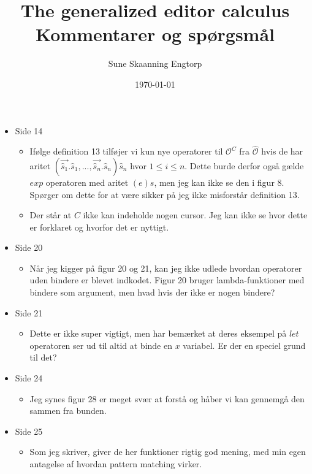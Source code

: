 \documentclass{article}
\title{The generalized editor calculus \\ Kommentarer og spørgsmål}
\date{\today}
\author{Sune Skaanning Engtorp}
\begin{document}
\maketitle

\begin{itemize}
    \item Side 14
        \begin{itemize}
            \item Ifølge definition 13 tilføjer vi kun nye operatorer til $\mathcal{O}^C$ fra $\hat{\mathcal{O}}$ hvis de har aritet $( \overrightarrow{\hat{s}_1}.\hat{s}_1,...,\overrightarrow{\hat{s}_n}.\hat{s}_n)\hat{s}_n$ hvor $1\leq i \leq n$. Dette burde derfor også gælde $exp$ operatoren med aritet $(e)s$, men jeg kan ikke se den i figur 8. Spørger om dette for at være sikker på jeg ikke misforstår definition 13.

            \item Der står at $C$ ikke kan indeholde nogen cursor. Jeg kan ikke se hvor dette er forklaret og hvorfor det er nyttigt.
        \end{itemize}
    \item Side 20
        \begin{itemize}
            \item Når jeg kigger på figur 20 og 21, kan jeg ikke udlede hvordan operatorer uden bindere er blevet indkodet. Figur 20 bruger lambda-funktioner med bindere som argument, men hvad hvis der ikke er nogen bindere?
        \end{itemize}
    \item Side 21
        \begin{itemize}
            \item Dette er ikke super vigtigt, men har bemærket at deres eksempel på $let$ operatoren ser ud til altid at binde en $x$ variabel. Er der en speciel grund til det?
        \end{itemize}
    \item Side 24
        \begin{itemize}
            \item Jeg synes figur 28 er meget svær at forstå og håber vi kan gennemgå den sammen fra bunden.
        \end{itemize}
    \item Side 25
        \begin{itemize}
            \item Som jeg skriver, giver de her funktioner rigtig god mening, med min egen antagelse af hvordan pattern matching virker.
        \end{itemize}
\end{itemize}



\printbibliography
\end{document}
